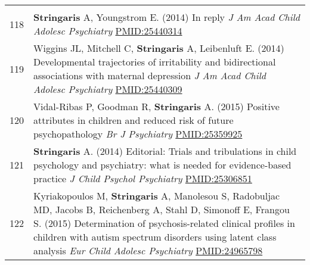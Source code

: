 \documentclass[
]{article}
\begin{document}
\begin{longtable}[]{@{}ll@{}}
\begin{minipage}[t]{0.94\columnwidth}
\end{minipage}\tabularnewline
\begin{minipage}[t]{0.01\columnwidth}\raggedright
118\strut
\end{minipage} & \begin{minipage}[t]{0.94\columnwidth}\raggedright
\textbf{Stringaris} A, Youngstrom E. (2014) In reply \emph{J Am Acad
Child Adolesc Psychiatry} \url{PMID:25440314}\strut
\end{minipage}\tabularnewline
\begin{minipage}[t]{0.01\columnwidth}\raggedright
119\strut
\end{minipage} & \begin{minipage}[t]{0.94\columnwidth}\raggedright
Wiggins JL, Mitchell C, \textbf{Stringaris} A, Leibenluft E. (2014)
Developmental trajectories of irritability and bidirectional
associations with maternal depression \emph{J Am Acad Child Adolesc
Psychiatry} \url{PMID:25440309}\strut
\end{minipage}\tabularnewline
\begin{minipage}[t]{0.01\columnwidth}\raggedright
120\strut
\end{minipage} & \begin{minipage}[t]{0.94\columnwidth}\raggedright
Vidal-Ribas P, Goodman R, \textbf{Stringaris} A. (2015) Positive
attributes in children and reduced risk of future psychopathology
\emph{Br J Psychiatry} \url{PMID:25359925}\strut
\end{minipage}\tabularnewline
\begin{minipage}[t]{0.01\columnwidth}\raggedright
121\strut
\end{minipage} & \begin{minipage}[t]{0.94\columnwidth}\raggedright
\textbf{Stringaris} A. (2014) Editorial: Trials and tribulations in
child psychology and psychiatry: what is needed for evidence-based
practice \emph{J Child Psychol Psychiatry} \url{PMID:25306851}\strut
\end{minipage}\tabularnewline
\begin{minipage}[t]{0.01\columnwidth}\raggedright
122\strut
\end{minipage} & \begin{minipage}[t]{0.94\columnwidth}\raggedright
Kyriakopoulos M, \textbf{Stringaris} A, Manolesou S, Radobuljac MD,
Jacobs B, Reichenberg A, Stahl D, Simonoff E, Frangou S. (2015)
Determination of psychosis-related clinical profiles in children with
autism spectrum disorders using latent class analysis \emph{Eur Child
Adolesc Psychiatry} \url{PMID:24965798}\strut

\end{minipage}
\end{longtable}
\end{document}
